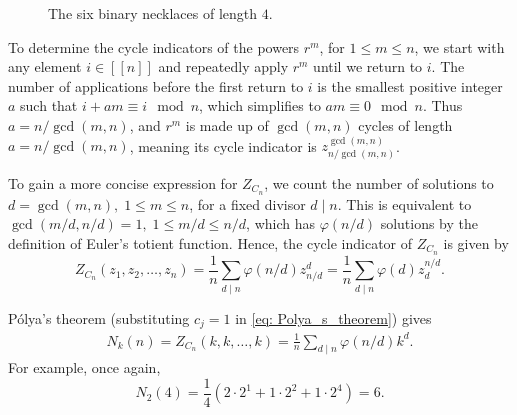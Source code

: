 \documentclass[a4paper,11pt]{article}
\numberwithin{equation}{section}
\def\llbracket{[\![}
\def\rrbracket{]\!]}
\begin{document}
\begin{figure}[H]
    \caption{The six binary necklaces of length $4$.}
    \label{fig:3}
    \end{figure}
    
    To determine the cycle indicators of the powers $r^m$, for $1\leq m \leq n$, we start with any element $i \in \llbracket n \rrbracket$ and repeatedly apply $r^m$ until we return to $i$. The number of applications before the first return to $i$ is the smallest positive integer $a$ such that $i + am \equiv i \mod{n}$, which simplifies to $am \equiv 0 \mod{n}$. Thus $a = n/\gcd(m,n)$, and $r^m$ is made up of $\gcd(m,n)$ cycles of length $a = n/\gcd(m,n)$, meaning its cycle indicator is $z_{n/ \gcd(m,n)}^{\gcd(m,n)}$. \smallskip
    
    To gain a more concise expression for $Z_{C_n}$, we count the number of solutions to $d=\gcd(m,n), \; 1\leq m\leq n$, for a fixed divisor $d\mid n$. This is equivalent to $\gcd(m/d ,  n/d) =1, \; 1\leq m/d  \leq n/d$, which has $\varphi(n/d)$ solutions by the definition of Euler's totient function. Hence, the cycle indicator of $Z_{C_n}$ is given by  \[Z_{C_{n}}(z_{1}, z_2, \dots, z_{n})= \frac{1}{n} \sum_{d\mid n} \varphi (n\text{/}d) z^{d}_{n\text{/}d} =\frac{1}{n} \sum_{d\mid n} \varphi (d) z^{n\text{/}d}_{d}. \]
    
    Pólya's theorem (substituting $c_j=1$ in \eqref{eq: Polya_s_theorem}) gives \begin{align*}
        N_k(n) = Z_{C_n}(k, k, \dots, k) = \frac{1}{n} \sum_{d \mid n} \varphi(n/d) k^{d}. 
    \end{align*} 
    For example, once again, 
    \[ N_2(4) = \frac{1}{4}( 2\cdot 2^1 + 1 \cdot 2^2 +  1 \cdot 2^{4} )  = 6.  \]
    
\end{document}
